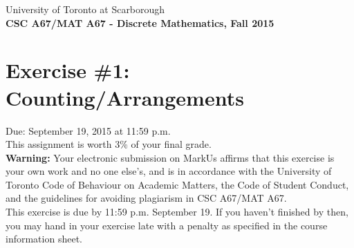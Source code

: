 \documentclass{article}
\begin{document}
{\large \noindent{}University of Toronto at Scarborough\\
\textbf{CSC A67/MAT A67 - Discrete Mathematics, Fall 2015}}

\section*{\huge Exercise \#1: Counting/Arrangements}

{\large Due: September 19, 2015 at 11:59 p.m.\\
This assignment is worth 3\% of your final grade.}\\[1em]
\textbf{Warning:} Your electronic submission on MarkUs affirms that this exercise is your own work and no
one else's, and is in accordance with the University of Toronto Code of Behaviour on Academic Matters,
the Code of Student Conduct, and the guidelines for avoiding plagiarism in CSC A67/MAT A67.\\[1ex]
This exercise is due by 11:59 p.m. September 19. If you haven't finished by then, you may hand in your
exercise late with a penalty as specified in the course information sheet.\\[1ex]
\renewcommand{\labelenumi}{\arabic{enumi}.}
\renewcommand{\labelenumii}{(\alph{enumii})}
\end{document}
